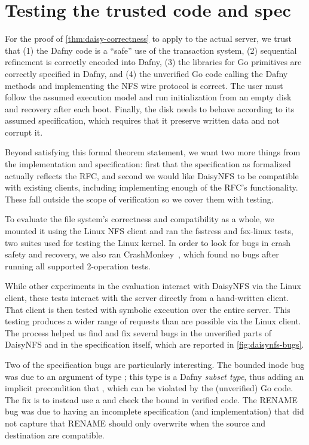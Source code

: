 \section{Testing the trusted code and spec}
\label{sec:eval:testing}

For the proof of \cref{thm:daisy-correctness} to apply to the actual server, we trust that (1) the
Dafny code is a ``safe'' use of the transaction system, (2) sequential
refinement is correctly encoded into Dafny, (3) the libraries for Go primitives
are correctly specified in Dafny, and (4) the unverified Go code calling the
Dafny methods and implementing the NFS wire protocol is correct. The
user must follow the assumed execution model and run initialization from an
empty disk and recovery after each boot. Finally, the disk needs to behave
according to its assumed specification, which requires that it preserve written
data and not corrupt it.

Beyond satisfying this formal theorem statement, we want two more things from
the implementation and specification: first that the specification as formalized
actually reflects the RFC, and second we would like DaisyNFS to be compatible
with existing clients, including implementing enough of the RFC's functionality.
These fall outside the scope of verification so we cover them with testing.

To evaluate the file system's correctness and compatibility as a whole, we
mounted it using the Linux NFS client and ran the fsstress and fsx-linux tests,
two suites used for testing the Linux kernel. In order to look for bugs in crash
safety and recovery, we also ran CrashMonkey~\cite{mohan:crashmonkey}, which
found no bugs after running all supported 2-operation tests.

While other experiments in the evaluation interact with DaisyNFS via the Linux
client, these tests interact with the server directly from a hand-written
client. That client is then tested with symbolic execution over the entire server.
This testing produces a wider range of requests than are possible via the Linux
client. The process helped us find and fix several bugs in the unverified parts
of DaisyNFS and in the specification itself, which are reported in
\cref{fig:daisynfs-bugs}.

Two of the specification bugs are particularly interesting. The bounded inode bug
was due to an  argument of type ; this type is a Dafny
\emph{subset type}, thus adding an implicit precondition that , which can be violated by the (unverified) Go code. The fix is to instead
use a  and check the bound in verified code. The RENAME bug was due
to having an incomplete specification (and implementation) that did not capture
that RENAME should only overwrite when the source and destination are
compatible.

